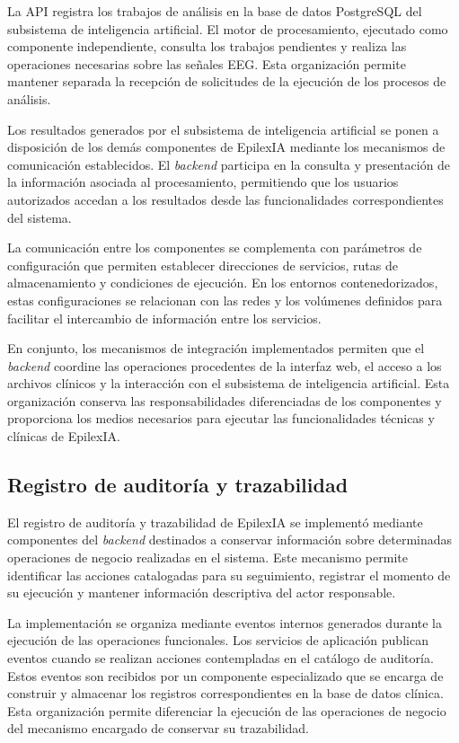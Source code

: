 La API registra los trabajos de análisis en la base de datos PostgreSQL del subsistema de inteligencia artificial. El motor de procesamiento, ejecutado como componente independiente, consulta los trabajos pendientes y realiza las operaciones necesarias sobre las señales EEG. Esta organización permite mantener separada la recepción de solicitudes de la ejecución de los procesos de análisis.

Los resultados generados por el subsistema de inteligencia artificial se ponen a disposición de los demás componentes de EpilexIA mediante los mecanismos de comunicación establecidos. El \textit{backend} participa en la consulta y presentación de la información asociada al procesamiento, permitiendo que los usuarios autorizados accedan a los resultados desde las funcionalidades correspondientes del sistema.

La comunicación entre los componentes se complementa con parámetros de configuración que permiten establecer direcciones de servicios, rutas de almacenamiento y condiciones de ejecución. En los entornos contenedorizados, estas configuraciones se relacionan con las redes y los volúmenes definidos para facilitar el intercambio de información entre los servicios.

En conjunto, los mecanismos de integración implementados permiten que el \textit{backend} coordine las operaciones procedentes de la interfaz web, el acceso a los archivos clínicos y la interacción con el subsistema de inteligencia artificial. Esta organización conserva las responsabilidades diferenciadas de los componentes y proporciona los medios necesarios para ejecutar las funcionalidades técnicas y clínicas de EpilexIA.

\subsection{Registro de auditoría y trazabilidad}

El registro de auditoría y trazabilidad de EpilexIA se implementó mediante componentes del \textit{backend} destinados a conservar información sobre determinadas operaciones de negocio realizadas en el sistema. Este mecanismo permite identificar las acciones catalogadas para su seguimiento, registrar el momento de su ejecución y mantener información descriptiva del actor responsable.

La implementación se organiza mediante eventos internos generados durante la ejecución de las operaciones funcionales. Los servicios de aplicación publican eventos cuando se realizan acciones contempladas en el catálogo de auditoría. Estos eventos son recibidos por un componente especializado que se encarga de construir y almacenar los registros correspondientes en la base de datos clínica. Esta organización permite diferenciar la ejecución de las operaciones de negocio del mecanismo encargado de conservar su trazabilidad.

